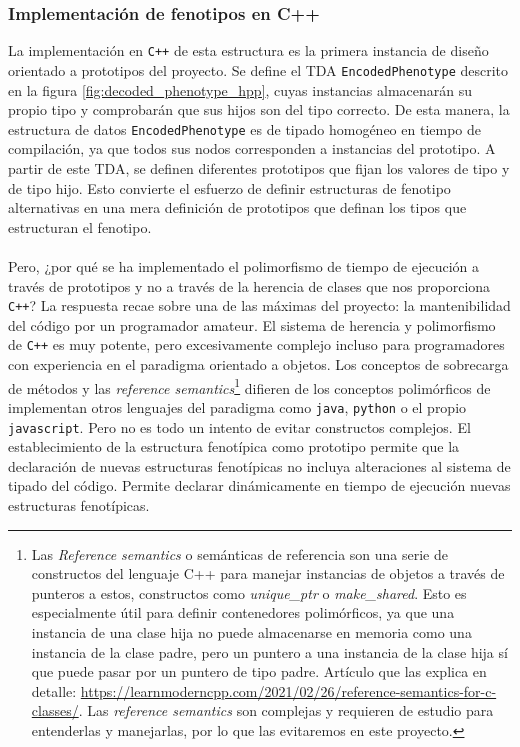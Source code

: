 \subsubsection{Implementación de fenotipos en C++}

La implementación en \verb|C++| de esta estructura es la primera instancia de diseño orientado a prototipos del proyecto. Se define el TDA \verb|EncodedPhenotype| descrito en la figura \ref{fig:decoded_phenotype_hpp}, cuyas instancias almacenarán su propio tipo y comprobarán que sus hijos son del tipo correcto. De esta manera, la estructura de datos \verb|EncodedPhenotype| es de tipado homogéneo en tiempo de compilación, ya que todos sus nodos corresponden a instancias del prototipo. A partir de este TDA, se definen diferentes prototipos que fijan los valores de tipo y de tipo hijo. Esto convierte el esfuerzo de definir estructuras de fenotipo alternativas en una mera definición de prototipos que definan los tipos que estructuran el fenotipo.
\\ \\
Pero, ¿por qué se ha implementado el polimorfismo de tiempo de ejecución a través de prototipos y no a través de la herencia de clases que nos proporciona \verb|C++|? La respuesta recae sobre una de las máximas del proyecto: la mantenibilidad del código por un programador amateur. El sistema de herencia y polimorfismo de \verb|C++| es muy potente, pero excesivamente complejo incluso para programadores con experiencia en el paradigma orientado a objetos. Los conceptos de sobrecarga de métodos y las \textit{reference semantics}\footnote{Las \textit{Reference semantics} o semánticas de referencia son una serie de constructos del lenguaje C++ para manejar instancias de objetos a través de punteros a estos, constructos como \textit{unique\_ptr} o \textit{make\_shared}. Esto es especialmente útil para definir contenedores polimórficos, ya que una instancia de una clase hija no puede almacenarse en memoria como una instancia de la clase padre, pero un puntero a una instancia de la clase hija sí que puede pasar por un puntero de tipo padre. Artículo que las explica en detalle: \url{https://learnmoderncpp.com/2021/02/26/reference-semantics-for-c-classes/}. Las \textit{reference semantics} son complejas y requieren de estudio para entenderlas y manejarlas, por lo que las evitaremos en este proyecto.} difieren de los conceptos polimórficos de implementan otros lenguajes del paradigma como \verb|java|, \verb|python| o el propio \verb|javascript|. Pero no es todo un intento de evitar constructos complejos. El establecimiento de la estructura fenotípica como prototipo permite que la declaración de nuevas estructuras fenotípicas no incluya alteraciones al sistema de tipado del código. Permite declarar dinámicamente en tiempo de ejecución nuevas estructuras fenotípicas.

